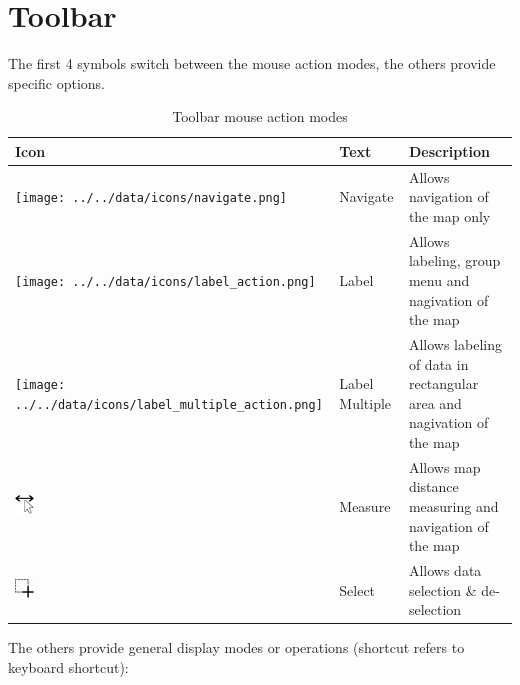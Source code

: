 \section{Toolbar}

The first 4 symbols switch between the mouse action modes, the others provide specific options.

\begin{table}[H]
  \center
  \begin{tabular}{ | l | l | l |}
    \hline
    \textbf{Icon} & \textbf{Text} &  \textbf{Description} \\ \hline
    \texttt{[image: ../../data/icons/navigate.png]} & Navigate & Allows navigation of the map only \\ \hline
    \texttt{[image: ../../data/icons/label\_action.png]} & Label & Allows labeling, group menu and nagivation of the map \\ \hline
    \texttt{[image: ../../data/icons/label\_multiple\_action.png]} & Label Multiple & Allows labeling of data in rectangular area and nagivation of the map \\ \hline
    \includegraphics[width=0.5cm,frame]{../../data/icons/measure_action.png} & Measure & Allows map distance measuring and navigation of the map \\ \hline
    \includegraphics[width=0.5cm,frame]{../../data/icons/select_action.png} & Select & Allows data selection \& de-selection \\ \hline
  \end{tabular}
  \caption{Toolbar mouse action modes}
\end{table}

The others provide general display modes or operations (shortcut refers to keyboard shortcut):

